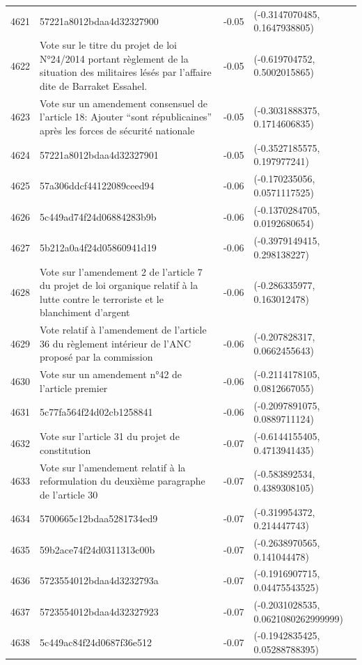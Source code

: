 \begin{table}[ht]
\begin{tabular}{rlrl}
  4621 & 57221a8012bdaa4d32327900 & -0.05 & (-0.3147070485, 0.1647938805) \\ 
  4622 & Vote sur le titre du projet de loi N°24/2014 portant règlement de la situation des militaires lésés par l’affaire dite de Barraket Essahel. & -0.05 & (-0.619704752, 0.5002015865) \\ 
  4623 & Vote sur un amendement consensuel de l'article 18: Ajouter “sont républicaines” après les forces de sécurité nationale & -0.05 & (-0.3031888375, 0.1714606835) \\ 
  4624 & 57221a8012bdaa4d32327901 & -0.05 & (-0.3527185575, 0.197977241) \\ 
  4625 & 57a306ddcf44122089ceed94 & -0.06 & (-0.170235056, 0.0571117525) \\ 
  4626 & 5c449ad74f24d06884283b9b & -0.06 & (-0.1370284705, 0.0192680654) \\ 
  4627 & 5b212a0a4f24d05860941d19 & -0.06 & (-0.3979149415, 0.298138227) \\ 
  4628 & Vote sur l'amendement 2 de l'article 7 du projet de loi organique relatif à la lutte contre le terroriste et le blanchiment d'argent & -0.06 & (-0.286335977, 0.163012478) \\ 
  4629 & Vote relatif à l'amendement de l'article 36 du règlement intérieur de l'ANC proposé par la commission & -0.06 & (-0.207828317, 0.0662455643) \\ 
  4630 & Vote sur un amendement n°42 de l'article premier & -0.06 & (-0.2114178105, 0.0812667055) \\ 
  4631 & 5c77fa564f24d02cb1258841 & -0.06 & (-0.2097891075, 0.0889711124) \\ 
  4632 & Vote sur l'article 31 du projet de constitution & -0.07 & (-0.6144155405, 0.4713941435) \\ 
  4633 & Vote sur l'amendement relatif à la reformulation du deuxième paragraphe de l'article 30 & -0.07 & (-0.583892534, 0.4389308105) \\ 
  4634 & 5700665c12bdaa5281734ed9 & -0.07 & (-0.319954372, 0.214447743) \\ 
  4635 & 59b2ace74f24d0311313c00b & -0.07 & (-0.2638970565, 0.141044478) \\ 
  4636 & 5723554012bdaa4d3232793a & -0.07 & (-0.1916907715, 0.04475543525) \\ 
  4637 & 5723554012bdaa4d32327923 & -0.07 & (-0.2031028535, 0.0621080262999999) \\ 
  4638 & 5c449ac84f24d0687f36e512 & -0.07 & (-0.1942835425, 0.05288788395) \\ 

\end{tabular}
\end{table}
